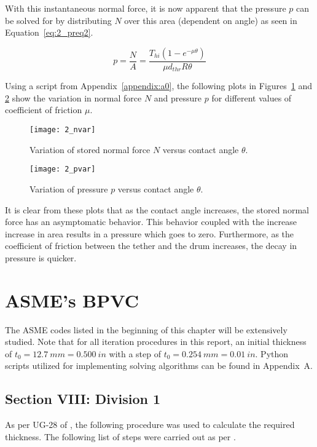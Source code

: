 With this instantaneous normal force, it is now apparent that the pressure $p$ can be solved for by distributing $N$ over this area (dependent on angle) as seen in Equation~\ref{eq:2_preq2}.

\begin{equation}
	\label{eq:2_preq2}
	p=\frac{N}{A}= \frac{T_{hi} \left( 1 - e^{-\mu \theta} \right)}{\mu d_{thr} R \theta}
\end{equation}

Using a script from Appendix~\ref{appendix:a0}, the following plots in Figures~\ref{fig:2_nvar} and \ref{fig:2_pvar} show the variation in normal force $N$ and pressure $p$ for different values of coefficient of friction $\mu$.

\begin{figure}[H]
	\centering
	\texttt{[image: 2\_nvar]}
	\caption{Variation of stored normal force $N$ versus contact angle $\theta$.}
	\label{fig:2_nvar}
\end{figure}

\begin{figure}[H]
	\centering
	\texttt{[image: 2\_pvar]}
	\caption{Variation of pressure $p$ versus contact angle $\theta$.}
	\label{fig:2_pvar}
\end{figure}

It is clear from these plots that as the contact angle increases, the stored normal force has an asymptomatic behavior. This behavior coupled with the increase increase in area results in a pressure which goes to zero. Furthermore, as the coefficient of friction between the tether and the drum increases, the decay in pressure is quicker.  

\section{ASME's BPVC}

The ASME codes listed in the beginning of this chapter will be extensively studied. Note that for all iteration procedures in this report, an initial thickness of $t_0 = 12.7\ mm=0.500\ in$ with a step of $t_0 = 0.254\ mm=0.01\ in$. Python scripts utilized for implementing solving algorithms can be found in Appendix~A.
\subsection{Section VIII: Division 1}
As per UG-28 of \cite{ASMEbvpcVII1}, the following procedure was used to calculate the required thickness.
The following list of steps were carried out as per \cite{ASMEbvpcVII1}.


